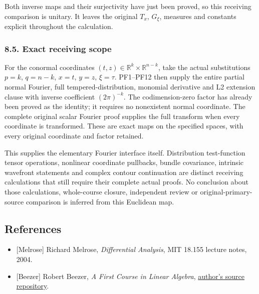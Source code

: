 \documentclass[
  11pt,
]{article}
\providecommand{\tightlist}{%
  \setlength{\itemsep}{0pt}\setlength{\parskip}{0pt}}
\begin{document}
Both inverse maps and their surjectivity have just been proved, so this
receiving comparison is unitary. It leaves the original \(T_x\),
\(G_\xi\), measures and constants explicit throughout the calculation.

\subsubsection{8.5. Exact receiving scope}\label{exact-receiving-scope}

For the conormal coordinates
\((t,z)\in\mathbb R^k\times\mathbb R^{n-k}\), take the actual
substitutions \(p=k\), \(q=n-k\), \(x=t\), \(y=z\), \(\xi=\tau\).
PF1--PF12 then supply the entire partial normal Fourier, full
tempered-distribution, monomial derivative and L2 extension clause with
inverse coefficient \((2\pi)^{-k}\). The codimension-zero factor has
already been proved as the identity; it requires no nonexistent normal
coordinate. The complete original scalar Fourier proof supplies the full
transform when every coordinate is transformed. These are exact maps on
the specified spaces, with every original coordinate and factor
retained.

This supplies the elementary Fourier interface itself. Distribution
test-function tensor operations, nonlinear coordinate pullbacks, bundle
covariance, intrinsic wavefront statements and complex contour
continuation are distinct receiving calculations that still require
their complete actual proofs. No conclusion about those calculations,
whole-course closure, independent review or original-primary-source
comparison is inferred from this Euclidean map.

\subsection{References}\label{references}

\begin{itemize}
\tightlist
\item
  {[}Melrose{]} Richard Melrose, \emph{Differential Analysis}, MIT
  18.155 lecture notes, 2004.
\item
  {[}Beezer{]} Robert Beezer, \emph{A First Course in Linear Algebra},
  \href{https://github.com/rbeezer/fcla}{author's source repository}.
\end{itemize}
\end{document}
